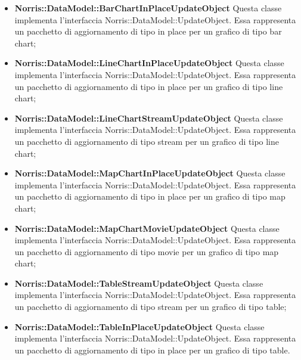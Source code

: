 \begin{itemize}
		\item \textbf{Norris::DataModel::BarChartInPlaceUpdateObject} Questa classe implementa l'interfaccia Norris::DataModel::UpdateObject. Essa rappresenta un pacchetto di aggiornamento di tipo in place per un grafico di tipo bar chart;

		\item \textbf{Norris::DataModel::LineChartInPlaceUpdateObject} Questa classe implementa l'interfaccia Norris::DataModel::UpdateObject. Essa rappresenta un pacchetto di aggiornamento di tipo in place per un grafico di tipo line chart;

		\item \textbf{Norris::DataModel::LineChartStreamUpdateObject} Questa classe implementa l'interfaccia Norris::DataModel::UpdateObject. Essa rappresenta un pacchetto di aggiornamento di tipo stream per un grafico di tipo line chart;

		\item \textbf{Norris::DataModel::MapChartInPlaceUpdateObject} Questa classe implementa l'interfaccia Norris::DataModel::UpdateObject. Essa rappresenta un pacchetto di aggiornamento di tipo in place per un grafico di tipo map chart;

		\item \textbf{Norris::DataModel::MapChartMovieUpdateObject} Questa classe implementa l'interfaccia Norris::DataModel::UpdateObject. Essa rappresenta un pacchetto di aggiornamento di tipo movie per un grafico di tipo map chart;

		\item \textbf{Norris::DataModel::TableStreamUpdateObject} Questa classe implementa l'interfaccia Norris::DataModel::UpdateObject. Essa rappresenta un pacchetto di aggiornamento di tipo stream per un grafico di tipo table;

		\item \textbf{Norris::DataModel::TableInPlaceUpdateObject} Questa classe implementa l'interfaccia Norris::DataModel::UpdateObject. Essa rappresenta un pacchetto di aggiornamento di tipo in place per un grafico di tipo table.
	\end{itemize}